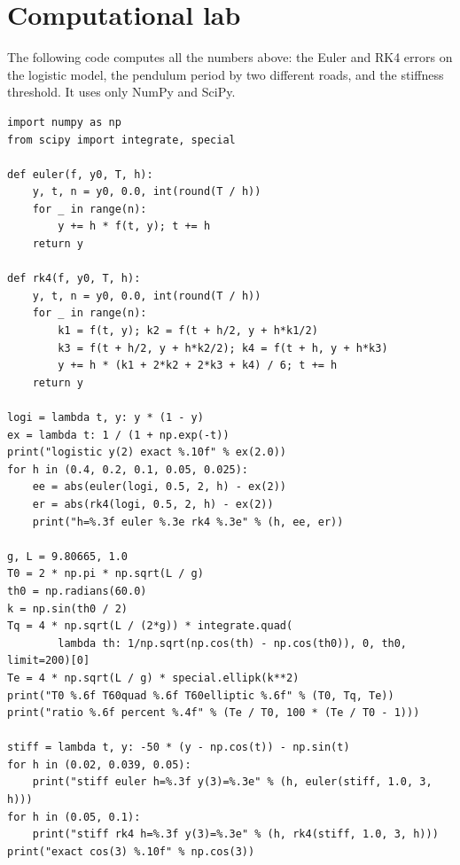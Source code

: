 
\section{Computational lab}

The following code computes all the numbers above: the Euler and RK4 errors on the logistic
model, the pendulum period by two different roads, and the stiffness threshold. It
uses only NumPy and SciPy.

\begin{lab}
\begin{verbatim}
import numpy as np
from scipy import integrate, special

def euler(f, y0, T, h):
    y, t, n = y0, 0.0, int(round(T / h))
    for _ in range(n):
        y += h * f(t, y); t += h
    return y

def rk4(f, y0, T, h):
    y, t, n = y0, 0.0, int(round(T / h))
    for _ in range(n):
        k1 = f(t, y); k2 = f(t + h/2, y + h*k1/2)
        k3 = f(t + h/2, y + h*k2/2); k4 = f(t + h, y + h*k3)
        y += h * (k1 + 2*k2 + 2*k3 + k4) / 6; t += h
    return y

logi = lambda t, y: y * (1 - y)
ex = lambda t: 1 / (1 + np.exp(-t))
print("logistic y(2) exact %.10f" % ex(2.0))
for h in (0.4, 0.2, 0.1, 0.05, 0.025):
    ee = abs(euler(logi, 0.5, 2, h) - ex(2))
    er = abs(rk4(logi, 0.5, 2, h) - ex(2))
    print("h=%.3f euler %.3e rk4 %.3e" % (h, ee, er))

g, L = 9.80665, 1.0
T0 = 2 * np.pi * np.sqrt(L / g)
th0 = np.radians(60.0)
k = np.sin(th0 / 2)
Tq = 4 * np.sqrt(L / (2*g)) * integrate.quad(
        lambda th: 1/np.sqrt(np.cos(th) - np.cos(th0)), 0, th0, limit=200)[0]
Te = 4 * np.sqrt(L / g) * special.ellipk(k**2)
print("T0 %.6f T60quad %.6f T60elliptic %.6f" % (T0, Tq, Te))
print("ratio %.6f percent %.4f" % (Te / T0, 100 * (Te / T0 - 1)))

stiff = lambda t, y: -50 * (y - np.cos(t)) - np.sin(t)
for h in (0.02, 0.039, 0.05):
    print("stiff euler h=%.3f y(3)=%.3e" % (h, euler(stiff, 1.0, 3, h)))
for h in (0.05, 0.1):
    print("stiff rk4 h=%.3f y(3)=%.3e" % (h, rk4(stiff, 1.0, 3, h)))
print("exact cos(3) %.10f" % np.cos(3))
\end{verbatim}
\end{lab}

